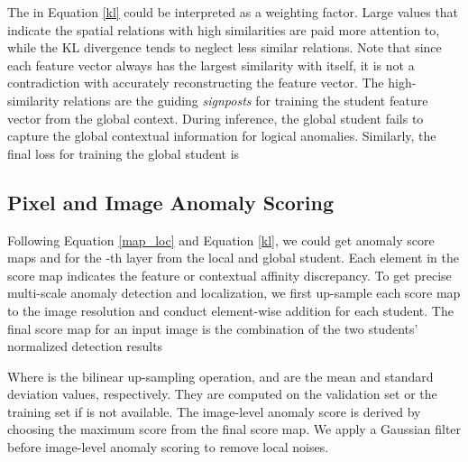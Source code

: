 \documentclass[10pt,twocolumn,letterpaper]{article}
\begin{document}
The  in Equation \eqref{kl} could be interpreted as a weighting factor. Large  values that indicate the spatial relations with high similarities are paid more attention to, while the KL divergence tends to neglect less similar relations. Note that since each feature vector always has the largest similarity with itself, it is not a contradiction with accurately reconstructing the feature vector. The high-similarity relations are the guiding \textit{signposts} for training the student feature vector from the global context. During inference, the global student fails to capture the global contextual information for logical anomalies. Similarly, the final loss for training the global student is 



\subsection{Pixel and Image Anomaly Scoring}
Following Equation \eqref{map_loc} and Equation \eqref{kl}, we could get anomaly score maps  and  for the -th layer from the local and global student. Each element in the score map indicates the feature or contextual affinity discrepancy. To get precise multi-scale anomaly detection and localization, we first up-sample each score map to the image resolution and  conduct element-wise addition for each student. The final score map for an input image  is the combination of the two students' normalized detection results

Where  is the bilinear up-sampling operation,  and  are the mean and standard deviation values, respectively. They are computed on the validation set  or the training set  if  is not available. The image-level anomaly score is derived by choosing the maximum score from the final score map. We apply a Gaussian filter before image-level anomaly scoring to remove local noises.
\end{document}
